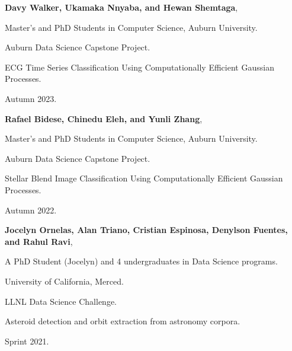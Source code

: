 \begin{innerlist}

  \item[] \textbf{Davy Walker, Ukamaka Nnyaba, and Hewan Shemtaga},
  \begin{innerlist}
    \item[-] Master's and PhD Students in Computer Science, Auburn University.
    \item[-] Auburn Data Science Capstone Project.
    \item[-] ECG Time Series Classification Using Computationally Efficient Gaussian Processes.
    \item[-] Autumn 2023.
  \end{innerlist}

  \item[] \textbf{Rafael Bidese, Chinedu Eleh, and Yunli Zhang},
  \begin{innerlist}
    \item[-] Master's and PhD Students in Computer Science, Auburn University.
    \item[-] Auburn Data Science Capstone Project.
    \item[-] Stellar Blend Image Classification Using Computationally Efficient Gaussian Processes.
    \item[-] Autumn 2022.
  \end{innerlist}

  \item[] \textbf{Jocelyn Ornelas, Alan Triano, Cristian Espinosa, Denylson Fuentes, and Rahul Ravi},
  \begin{innerlist}
    \item[-] A PhD Student (Jocelyn) and 4 undergraduates in Data Science programs.
    \item[-] University of California, Merced.
    \item[-] LLNL Data Science Challenge.
    \item[-] Asteroid detection and orbit extraction from astronomy corpora.
    \item[-] Sprint 2021.
  \end{innerlist}

\end{innerlist}
